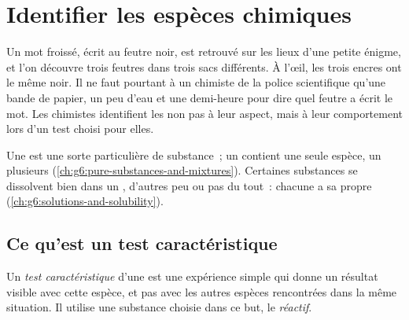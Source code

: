 \chapter{Identifier les espèces chimiques}\label{ch:g7:identifying-substances}

Un mot froissé, écrit au feutre noir, est retrouvé sur les lieux d'une
petite énigme, et l'on découvre trois feutres dans trois sacs
différents. À l'œil, les trois encres ont le même noir. Il ne faut
pourtant à un chimiste de la police scientifique qu'une bande de
papier, un peu d'eau et une demi-heure pour dire quel feutre a écrit le
mot. Les chimistes identifient les  non pas à leur
aspect, mais à leur comportement lors d'un test choisi pour elles.

\begin{recall}
Une  est une sorte particulière de substance~; un  contient une seule espèce, un  plusieurs
(\cref{ch:g6:pure-substances-and-mixtures}). Certaines substances se
dissolvent bien dans un , d'autres peu ou pas du tout~: chacune a
sa propre  (\cref{ch:g6:solutions-and-solubility}).
\end{recall}

\section{Ce qu'est un test caractéristique}

\begin{definition}\label{def:g7:identifying-substances:characteristic-test}
Un \emph{test caractéristique} d'une  est une expérience simple qui donne un résultat visible avec
cette espèce, et pas avec les autres espèces rencontrées dans la même
situation. Il utilise une substance choisie dans ce but, le
\emph{réactif}.
\end{definition}



